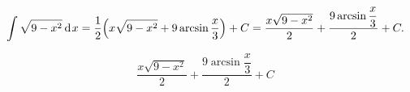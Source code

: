 {}

$$
   \int \sqrt{9-x^2}\hspace{2pt}\text{d}\hspace{1pt}{x}
= \dfrac{1}{2}\Big(x\sqrt{9-x^2}+9\arcsin{\dfrac{x}{3}}\Big)+C
= \dfrac{x\sqrt{9-x^2}}{2} + \dfrac{9\arcsin{\dfrac{x}{3}}}{2} + C.
$$

$$
  \boxed{\dfrac{x\sqrt{9-x^2}}{2} + \dfrac{9\arcsin{\dfrac{x}{3}}}{2} + C}
$$
